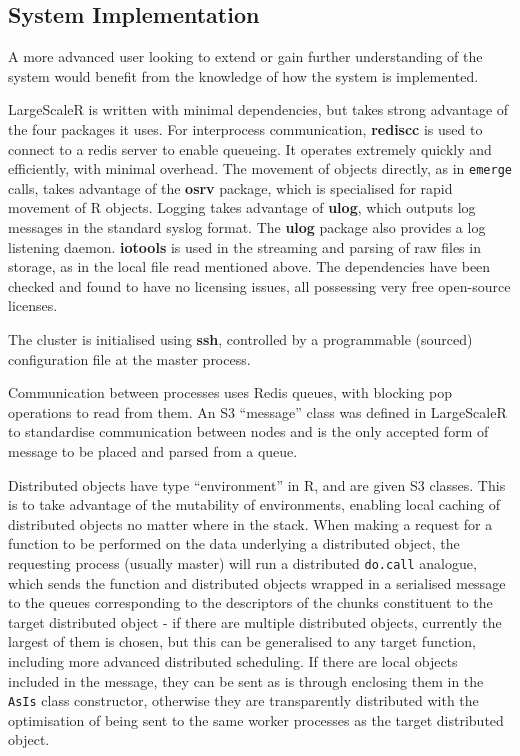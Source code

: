 \subsection{System Implementation}\label{sec:sys-imp}

A more advanced user looking to extend or gain further understanding of the system would benefit from the knowledge of how the system is implemented.

LargeScaleR is written with minimal dependencies, but takes strong advantage of the four packages it uses.
For interprocess communication, \textbf{rediscc} is used to connect to a redis server to enable queueing.
It operates extremely quickly and efficiently, with minimal overhead.
The movement of objects directly, as in \texttt{emerge} calls, takes advantage of the \textbf{osrv} package, which is specialised for rapid movement of R objects.
Logging takes advantage of \textbf{ulog}, which outputs log messages in the standard syslog format.
The \textbf{ulog} package also provides a log listening daemon.
\textbf{iotools} is used in the streaming and parsing of raw files in storage, as in the local file read mentioned above.
The dependencies have been checked and found to have no licensing issues, all possessing very free open-source licenses.

The cluster is initialised using \textbf{ssh}, controlled by a programmable (sourced) configuration file at the master process.

Communication between processes uses Redis queues, with blocking pop operations to read from them.
An S3 ``message'' class was defined in LargeScaleR to standardise communication between nodes and is the only accepted form of message to be placed and parsed from a queue.

Distributed objects have type ``environment'' in R, and are given S3 classes.
This is to take advantage of the mutability of environments, enabling local caching of distributed objects no matter where in the stack.
When making a request for a function to be performed on the data underlying a distributed object, the requesting process (usually master) will run a distributed \texttt{do.call} analogue, which sends the function and distributed objects wrapped in a serialised message to the queues corresponding to the descriptors of the chunks constituent to the target distributed object - if there are multiple distributed objects, currently the largest of them is chosen, but this can be generalised to any target function, including more advanced distributed scheduling.
If there are local objects included in the message, they can be sent as is through enclosing them in the \texttt{AsIs} class constructor, otherwise they are transparently distributed with the optimisation of being sent to the same worker processes as the target distributed object.

